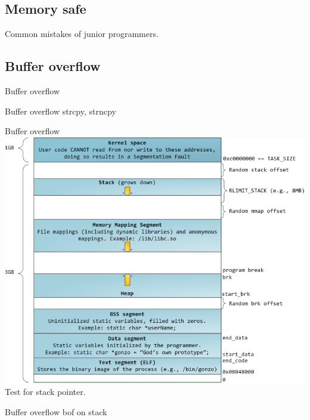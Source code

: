 \documentclass{beamer}
\begin{document}
\begin{CJK*}{UTF8}{bsmi}
    \section{Memory safe}
    \begin{frame}
        \centering
        \Large
        Common mistakes of junior programmers.
    \end{frame}

    \subsection{Buffer overflow}
    \begin{frame}{Buffer overflow}
        
    \end{frame}

    \begin{frame}{Buffer overflow}
        strcpy, strncpy
        
        
    \end{frame}

    \begin{frame}{Buffer overflow}
        \centering\includegraphics[width=.8\textwidth]{32bit_mem_layout.png}\\
        Test for stack pointer.
    \end{frame}

    \begin{frame}{Buffer overflow}
        bof on stack
        
    \end{frame}


\end{CJK*}
\end{document}
